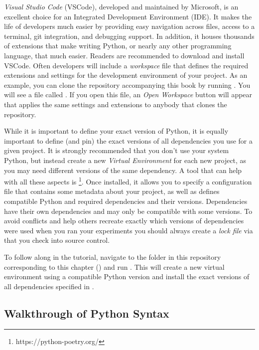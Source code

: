 \textit{Visual Studio Code} (VSCode), developed and maintained by Microsoft, is an excellent choice for an Integrated Development Environment (IDE).
It makes the life of developers much easier by providing easy navigation across files, access to a terminal, git integration, and debugging support.
In addition, it houses thousands of extensions that make writing Python, or nearly any other programming language, that much easier.
Readers are recommended to download and install VSCode.
Often developers will include a \textit{workspace} file that defines the required extensions and settings for the development environment of your project.
As an example, you can clone the repository accompanying this book by running .
You will see a file called .
If you open this file, an \textit{Open Workspace} button will appear that applies the same settings and extensions to anybody that clones the repository.

While it is important to define your exact version of Python, it is equally important to define (and pin) the exact versions of all dependencies you use for a given project.
It is strongly recommended that you don't use your system Python, but instead create a new \textit{Virtual Environment} for each new project, as you may need different versions of the same dependency.
A tool that can help with all these aspects is \footnote{https://python-poetry.org/}.
Once installed, it allows you to specify a  configuration file that contains some metadata about your project, as well as defines compatible Python and required dependencies and their versions.
Dependencies have their own dependencies and may only be compatible with some versions.
To avoid conflicts and help others recreate exactly which versions of dependencies were used when you ran your experiments you should always create a \textit{lock file} via  that you check into source control.

To follow along in the tutorial, navigate to the folder in this repository corresponding to this chapter () and run .
This will create a new virtual environment using a compatible Python version and install the exact versions of all dependencies specified in .

\subsection{Walkthrough of Python Syntax}

